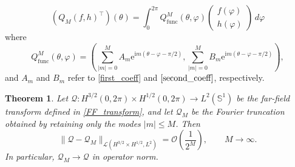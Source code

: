 \documentclass{article}
\newtheorem{Theorem}{Theorem}[section]
\begin{document}
\[
(Q_{M}(f,h)^\top)(\theta)=\int_0^{2\pi}Q_{\mathrm{func}}^M(\theta,\varphi)\begin{pmatrix}
    f(\varphi)\\
    h(\varphi)
\end{pmatrix}\,d\varphi
\]
where
\[
Q_{\mathrm{func}}^M(\theta,\varphi)
=
\left(\sum_{|m|=0}^M A_m \mathrm e^{\mathrm im(\theta-\varphi-\pi/2)},\sum_{|m|=0}^M B_m \mathrm e^{\mathrm im(\theta-\varphi-\pi/2)}\right),
\]
and $A_m$ and $B_m$ refer to \eqref{first_coeff} and $\eqref{second_coeff}$, respectively.
\begin{Theorem}\label{convergence_THM}
Let
$\mathcal Q:H^{3/2}(0,2\pi)\times H^{1/2}(0,2\pi)
\rightarrow L^2(\mathbb S^1)$ be the far-field transform defined in \eqref{FF_transform}, and let
$\mathcal Q_M$ be the Fourier truncation obtained by retaining only the
modes $|m|\leq M$. Then
\[
\|\mathcal Q-\mathcal Q_M\|_{\mathcal L(H^{3/2}\times H^{1/2},L^2)}
=
\mathcal O\left(
\frac{1}{2^M}
\right),
\qquad M\rightarrow\infty .
\]
In particular,
$
\mathcal Q_M\rightarrow \mathcal Q$ in operator norm.
\end{Theorem}
\end{document}
